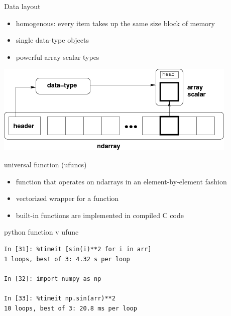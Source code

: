 \begin{frame}
  Data layout
  \begin{itemize}
  \item homogenous: every item takes up the same size block of memory
  \item single data-type objects
  \item powerful array scalar types
  \end{itemize}
  \begin{center}
    \includegraphics[scale=.5]{../figures/numpy/threefundamental.png}
  \end{center}
\end{frame}

\begin{frame}[fragile]
  universal function (ufuncs)
  \begin{itemize}
  \item function that operates on ndarrays in an element-by-element fashion
  \item vectorized wrapper for a function
  \item built-in functions are implemented in compiled C code
  \end{itemize}
  \begin{block}{python function v ufunc}
    \begin{verbatim}
In [31]: %timeit [sin(i)**2 for i in arr]
1 loops, best of 3: 4.32 s per loop

In [32]: import numpy as np

In [33]: %timeit np.sin(arr)**2
10 loops, best of 3: 20.8 ms per loop
    \end{verbatim}
  \end{block}
\end{frame}

